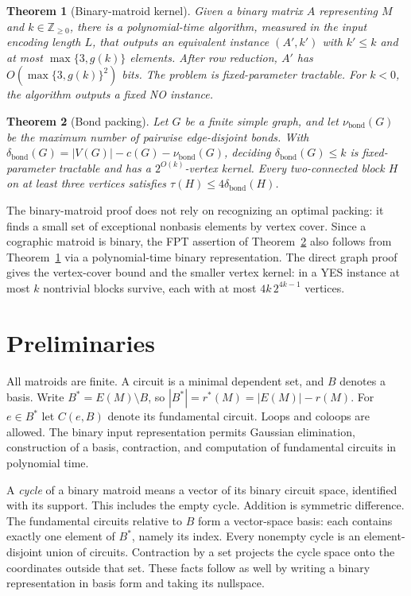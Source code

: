 \documentclass[11pt]{article}
\newtheorem{theorem}{Theorem}
\newcommand{\bond}{\operatorname{bond}}
\begin{document}
\begin{theorem}[Binary-matroid kernel]\label{thm:main}
Given a binary matrix $A$ representing $M$ and
$k\in\mathbb Z_{\geq0}$, there is a polynomial-time algorithm, measured
in the input encoding length $L$, that outputs an equivalent instance
$(A',k')$ with $k'\leq k$ and at most $\max\{3,g(k)\}$ elements.
After row reduction, $A'$ has $O(\max\{3,g(k)\}^2)$ bits.  The problem
is fixed-parameter tractable.  For $k<0$, the algorithm outputs a
fixed NO instance.
\end{theorem}

\begin{theorem}[Bond packing]\label{thm:bond-main}
Let $G$ be a finite simple graph, and let $\nu_{\bond}(G)$ be the maximum
number of pairwise edge-disjoint bonds.  With
$\delta_{\bond}(G)=|V(G)|-c(G)-\nu_{\bond}(G)$, deciding
$\delta_{\bond}(G)\leq k$ is fixed-parameter tractable and has a
$2^{O(k)}$-vertex kernel.  Every two-connected block $H$ on at least
three vertices satisfies $\tau(H)\leq4\delta_{\bond}(H)$.
\end{theorem}

The binary-matroid proof does not rely on recognizing an optimal packing:
it finds a small set of exceptional nonbasis elements by vertex cover.
Since a cographic matroid is binary, the FPT assertion of
Theorem~\ref{thm:bond-main} also follows from Theorem~\ref{thm:main}
via a polynomial-time binary representation.  The direct graph proof
gives the vertex-cover bound and the smaller vertex kernel: in a YES
instance at most $k$ nontrivial blocks survive, each with at most
$4k\,2^{4k-1}$ vertices.

\section{Preliminaries}\label{sec:prelim}
All matroids are finite.  A circuit is a minimal dependent set, and
$B$ denotes a basis.  Write $B^*=E(M)\setminus B$, so
$|B^*|=r^*(M)=|E(M)|-r(M)$.  For $e\in B^*$ let $C(e,B)$ denote its
fundamental circuit.  Loops and coloops are allowed.  The binary input
representation permits Gaussian elimination, construction of a basis,
contraction, and computation of fundamental circuits in polynomial time.

A \emph{cycle} of a binary matroid means a vector of its binary circuit
space, identified with its support.  This includes the empty cycle.
Addition is symmetric difference.  The fundamental circuits relative
to $B$ form a vector-space basis: each contains exactly one element of
$B^*$, namely its index.  Every nonempty cycle is an element-disjoint
union of circuits.  Contraction by a set projects the cycle space onto
the coordinates outside that set.  These facts follow as well by writing
a binary representation in basis form and taking its nullspace.
\end{document}

